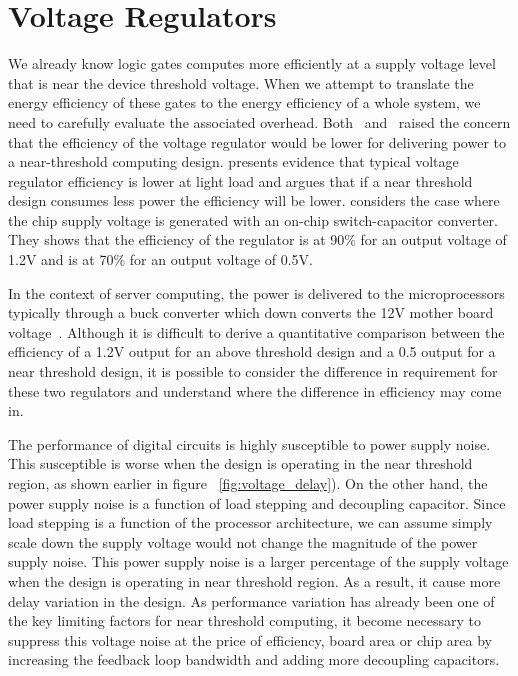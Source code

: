 \section{Voltage Regulators}

We already know logic gates computes more efficiently at a supply voltage level
that is near the device threshold voltage. When we attempt to translate the
energy efficiency of these gates to the energy efficiency of a whole system, we
need to carefully evaluate the associated overhead.
Both~\cite{dreslinski2010near,Zhai:2007kn}
and~\cite{dreslinski2010near,Zhai:2007kn} raised the concern that the efficiency
of the voltage regulator would be lower for delivering power to a near-threshold
computing design. \cite{dreslinski2010near,Zhai:2007kn} presents evidence that
typical voltage regulator efficiency is lower at light load and argues that if a
near threshold design consumes less power the efficiency will be lower.
\cite{dreslinski2010near,Zhai:2007kn} considers the case where the chip supply
voltage is generated with an on-chip switch-capacitor converter. They shows that
the efficiency of the regulator is at 90\% for an output voltage of 1.2V and is
at 70\% for an output voltage of 0.5V.

In the context of server computing, the power is delivered to the
microprocessors typically through a buck converter which down converts the 12V
mother board voltage~\cite{dreslinski2010near,Zhai:2007kn}. Although it is
difficult to derive a quantitative comparison between the efficiency of a 1.2V
output for an above threshold design and a 0.5 output for a near threshold
design, it is possible to consider the difference in requirement for these two
regulators and understand where the difference in efficiency may come in. 

The performance of digital circuits is highly susceptible to power supply noise.
This susceptible is worse when the design is operating in the near threshold
region, as shown earlier in figure ~\ref{fig:voltage_delay}). On the other hand,
the power supply noise is a function of load stepping and decoupling capacitor.
Since load stepping is a function of the processor architecture, we can assume
simply scale down the supply voltage would not change the magnitude of the power
supply noise. This power supply noise is a larger percentage of the supply
voltage when the design is operating in near threshold region. As a result, it
cause more delay variation in the design. As performance variation has already
been one of the key limiting factors for near threshold computing, it become
necessary to suppress this voltage noise at the price of efficiency, board area
or chip area by increasing the feedback loop bandwidth and adding more
decoupling capacitors.

